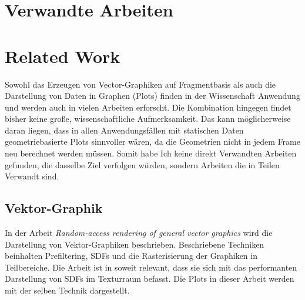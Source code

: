 {\chapter{Verwandte Arbeiten}}
{\chapter{Related Work}}
\label{sec:related}

Sowohl das Erzeugen von Vector-Graphiken auf Fragmentbasis als auch die Darstellung von Daten in Graphen (Plots) finden in der Wissenschaft Anwendung und werden auch in vielen Arbeiten erforscht. Die Kombination hingegen findet bisher keine große, wissenschaftliche Aufmerksamkeit. Das kann möglicherweise daran liegen, dass in allen Anwendungsfällen mit statischen Daten geometriebasierte Plots sinnvoller wären, da die Geometrien nicht in jedem Frame neu berechnet werden müssen. Somit habe Ich keine direkt Verwandten Arbeiten gefunden, die dasselbe Ziel verfolgen würden, sondern Arbeiten die in Teilen Verwandt sind.

\section{Vektor-Graphik}
In der Arbeit \textit{Random-access rendering of general vector graphics}\cite{Nehab2008} wird die Darstellung von Vektor-Graphiken beschrieben. Beschriebene Techniken beinhalten Prefiltering, SDFs und die Rasterisierung der Graphiken in Teilbereiche.
Die Arbeit ist in soweit relevant, dass sie sich mit das performanten Darstellung von SDFs im Texturraum befasst.
Die Plots in dieser Arbeit werden mit der selben Technik dargestellt.


